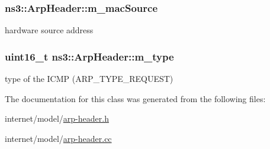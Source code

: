 \subsubsection[{\texorpdfstring{m\+\_\+mac\+Source}{m_macSource}}]{ ns3\+::\+Arp\+Header\+::m\+\_\+mac\+Source}\hypertarget{classns3_1_1ArpHeader_a203567d8a9119ebb3d8f572627711467}{}\label{classns3_1_1ArpHeader_a203567d8a9119ebb3d8f572627711467}


hardware source address 

\subsubsection[{\texorpdfstring{m\+\_\+type}{m_type}}]{\setlength{\rightskip}{0pt plus 5cm}uint16\+\_\+t ns3\+::\+Arp\+Header\+::m\+\_\+type}\hypertarget{classns3_1_1ArpHeader_a8b5d651b2153bd85714a376df62e93e0}{}\label{classns3_1_1ArpHeader_a8b5d651b2153bd85714a376df62e93e0}


type of the I\+C\+MP (A\+R\+P\+\_\+\+T\+Y\+P\+E\+\_\+\+R\+E\+Q\+U\+E\+ST) 



The documentation for this class was generated from the following files\+:\begin{DoxyCompactItemize}
\item 
internet/model/\hyperlink{arp-header_8h}{arp-\/header.\+h}\item 
internet/model/\hyperlink{arp-header_8cc}{arp-\/header.\+cc}\end{DoxyCompactItemize}
